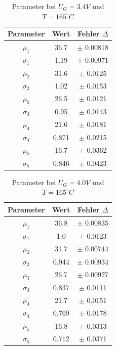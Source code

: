 \documentclass{article}
\begin{document}
\begin{multicols}{2}
\begin{table}[H]
  \centering
  \begin{tabular}{|c|c|c|}
      \hline
      Parameter & Wert & Fehler $\Delta$ \\ \hline
      $\mu_1$ & 36.7 & $\pm$ 0.00818 \\ \hline
      $\sigma_1$ & 1.19 & $\pm$ 0.00971 \\ \hline
      $\mu_2$ & 31.6 & $\pm$ 0.0125 \\ \hline
      $\sigma_2$ & 1.02 & $\pm$ 0.0153 \\ \hline
      $\mu_3$ & 26.5 & $\pm$ 0.0121 \\ \hline
      $\sigma_3$ & 0.95 & $\pm$ 0.0143 \\ \hline
      $\mu_4$ & 21.6 & $\pm$ 0.0181 \\ \hline
      $\sigma_4$ & 0.871 & $\pm$ 0.0215 \\ \hline
      $\mu_5$ & 16.7 & $\pm$ 0.0362 \\ \hline
      $\sigma_5$ & 0.846 & $\pm$ 0.0423 \\ \hline
  \end{tabular}
  \caption{Parameter bei $U_G=3.4V$ und $T=165^\circ C$}
  \label{tab:data_no_height_3}
\end{table}

\begin{table}[H]
  \centering
  \begin{tabular}{|c|c|c|}
      \hline
      Parameter & Wert & Fehler $\Delta$ \\ \hline
      $\mu_1$ & 36.8 & $\pm$ 0.00835 \\ \hline
      $\sigma_1$ & 1.0 & $\pm$ 0.0123 \\ \hline
      $\mu_2$ & 31.7 & $\pm$ 0.00744 \\ \hline
      $\sigma_2$ & 0.944 & $\pm$ 0.00934 \\ \hline
      $\mu_3$ & 26.7 & $\pm$ 0.00927 \\ \hline
      $\sigma_3$ & 0.837 & $\pm$ 0.0111 \\ \hline
      $\mu_4$ & 21.7 & $\pm$ 0.0151 \\ \hline
      $\sigma_4$ & 0.769 & $\pm$ 0.0178 \\ \hline
      $\mu_5$ & 16.8 & $\pm$ 0.0313 \\ \hline
      $\sigma_5$ & 0.712 & $\pm$ 0.0371 \\ \hline
  \end{tabular}
  \caption{Parameter bei $U_G=4.0V$ und $T=165^\circ C$}
  \label{tab:data_no_height_5}
\end{table}


\end{multicols}
\end{document}
